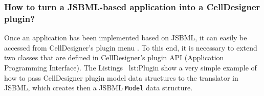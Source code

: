 \subsubsection{How to turn a JSBML-based application into a CellDesigner plugin?}

Once an application has been implemented based on JSBML, it can easily be
accessed from CellDesigner's plugin menu \citep{Funahashi2003}. To this end,
it is necessary to extend two classes that are defined in CellDesigner's plugin
API (Application Programming Interface).%
The Listings~ {lst:Plugin} show a very simple example
of how to pass CellDesigner plugin
model data structures to the translator in JSBML,
which creates then a JSBML \texttt{Model} data
structure.%

% 
